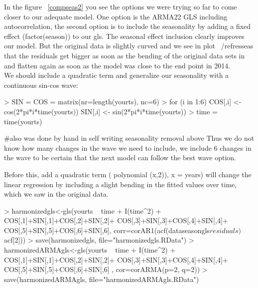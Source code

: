 \documentclass[10pt, a4paper]{article} %
\begin{document}
In the figure ~\ref{compseas2} you see the options we were trying so far to come closer to our adequate model. One option is the ARMA22 GLS including autocorrelation, the second option is to include the seasonality by adding a fixed effect (factor(season)) to our gls. 
The seasonal effect inclusion clearly improves our model. But the original data is slightly curved and we see in plot ~/ref{resseas} that the residuals get bigger as soon as the bending of the original data sets in and flatten again as soon as the model was close to the end point in 2014. \\

We should include a quadratic term and generalize our seasonality with a continuous sin-cos wave:\\

\begin{Schunk}
\begin{Sinput}
> SIN = COS = matrix(nr=length(yourts), nc=6)
> for (i in 1:6) {
   COS[,i] <- cos(2*pi*i*time(yourts))
   SIN[,i] <- sin(2*pi*i*time(yourts)) 
 }
> time = time(yourts)
\end{Sinput}
\end{Schunk}
#also was done by hand in self writing seasonality removal above
Thus we do not know how many changes in the wave we need to include, we include 6 changes in the wave to be certain that the next model can follow the best wave option. 

Before this, add a quadratic term ( polynomial (x,2)), x = years) will change the linear regression by including a slight bending in the fitted values over time, which we saw in the original data. 


\begin{Schunk}
\begin{Sinput}
> harmonizedgls<-gls(yourts ~ time + I(time^2) +
                     COS[,1]+SIN[,1]+COS[,2]+SIN[,2]+
                     COS[,3]+SIN[,3]+COS[,4]+SIN[,4]+
                     COS[,5]+SIN[,5]+COS[,6]+SIN[,6],
                   corr=corAR1(acf(dataseasongls$residuals)$acf[2]))
> save(harmonizedgls, file="harmonizedgls.RData")
> harmonizedARMAgls<-gls(yourts ~ time + I(time^2) +
                       COS[,1]+SIN[,1]+COS[,2]+SIN[,2]+
                       COS[,3]+SIN[,3]+COS[,4]+SIN[,4]+
                       COS[,5]+SIN[,5]+COS[,6]+SIN[,6]
                     , cor=corARMA(p=2, q=2))
> save(harmonizedARMAgls, file="harmonizedARMAgls.RData")
\end{Sinput}
\end{Schunk}
\end{document}
